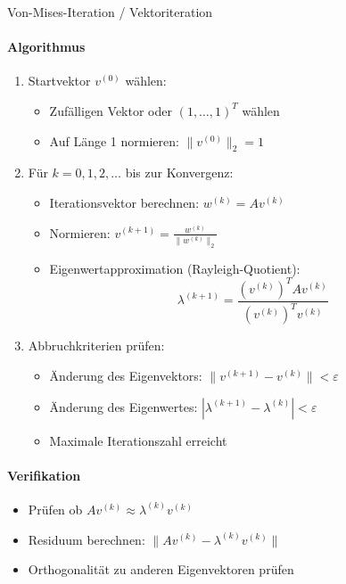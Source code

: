 \begin{KR}{Von-Mises-Iteration / Vektoriteration}
\paragraph{Algorithmus}
\begin{enumerate}
    \item Startvektor $v^{(0)}$ wählen:
    \begin{itemize}
        \item Zufälligen Vektor oder $(1,\ldots,1)^T$ wählen
        \item Auf Länge 1 normieren: $\|v^{(0)}\|_2 = 1$
    \end{itemize}

    \item Für $k = 0,1,2,\ldots$ bis zur Konvergenz:
    \begin{itemize}
        \item Iterationsvektor berechnen: $w^{(k)} = Av^{(k)}$
        \item Normieren: $v^{(k+1)} = \frac{w^{(k)}}{\|w^{(k)}\|_2}$
        \item Eigenwertapproximation (Rayleigh-Quotient):
              $$\lambda^{(k+1)} = \frac{(v^{(k)})^TAv^{(k)}}{(v^{(k)})^Tv^{(k)}}$$
    \end{itemize}

    \item Abbruchkriterien prüfen:
    \begin{itemize}
        \item Änderung des Eigenvektors: $\|v^{(k+1)} - v^{(k)}\| < \varepsilon$
        \item Änderung des Eigenwertes: $|\lambda^{(k+1)} - \lambda^{(k)}| < \varepsilon$
        \item Maximale Iterationszahl erreicht
    \end{itemize}
\end{enumerate}

\paragraph{Verifikation}
\begin{itemize}
    \item Prüfen ob $Av^{(k)} \approx \lambda^{(k)}v^{(k)}$
    \item Residuum berechnen: $\|Av^{(k)} - \lambda^{(k)}v^{(k)}\|$
    \item Orthogonalität zu anderen Eigenvektoren prüfen
\end{itemize}
\end{KR}

